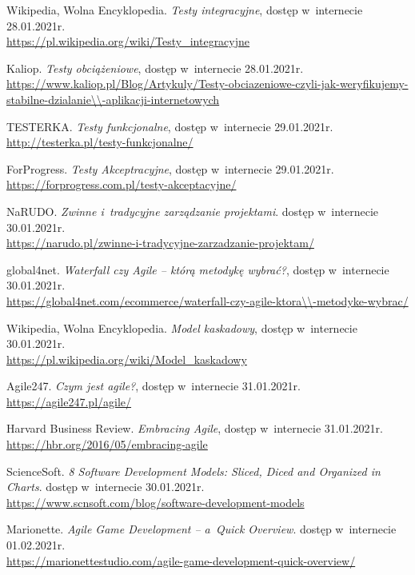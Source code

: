 \documentclass[oneside,polski,logo]{amuthesis}
\begin{document}
\begin{thebibliography}{100}
Wikipedia, Wolna Encyklopedia. \emph{Testy integracyjne}, dostęp w~internecie 28.01.2021r.\\
\url{https://pl.wikipedia.org/wiki/Testy\_integracyjne}

Kaliop. \emph{Testy obciążeniowe}, dostęp w~internecie 28.01.2021r.\\
\url{https://www.kaliop.pl/Blog/Artykuly/Testy-obciazeniowe-czyli-jak-weryfikujemy-stabilne-dzialanie\\-aplikacji-internetowych}

TESTERKA. \emph{Testy funkcjonalne}, dostęp w~internecie 29.01.2021r.\\
\url{http://testerka.pl/testy-funkcjonalne/}

ForProgress. \emph{Testy Akceptracyjne}, dostęp w~internecie 29.01.2021r.\\
\url{https://forprogress.com.pl/testy-akceptacyjne/}

NaRUDO. \emph{Zwinne i~tradycyjne zarządzanie projektami}. dostęp w~internecie 30.01.2021r.\\
\url{https://narudo.pl/zwinne-i-tradycyjne-zarzadzanie-projektam/}

global4net. \emph{Waterfall czy Agile – którą metodykę wybrać?}, dostęp w~internecie 30.01.2021r.\\
 \url{https://global4net.com/ecommerce/waterfall-czy-agile-ktora\\-metodyke-wybrac/}

Wikipedia, Wolna Encyklopedia. \emph{Model kaskadowy}, dostęp w~internecie 30.01.2021r.\\
\url{https://pl.wikipedia.org/wiki/Model\_kaskadowy}

Agile247. \emph{Czym jest agile?}, dostęp w~internecie 31.01.2021r.\\
\url{https://agile247.pl/agile/}

Harvard Business Review. \emph{Embracing Agile}, dostęp w~internecie 31.01.2021r.\\
\url{https://hbr.org/2016/05/embracing-agile}

ScienceSoft. \emph{8 Software Development Models: Sliced, Diced and Organized in Charts}.  dostęp w~internecie 30.01.2021r.\\
\url{https://www.scnsoft.com/blog/software-development-models}

Marionette. \emph{Agile Game Development – a~Quick Overview}. dostęp w~internecie 01.02.2021r.\\
\url{https://marionettestudio.com/agile-game-development-quick-overview/}


\end{thebibliography}
\end{document}
